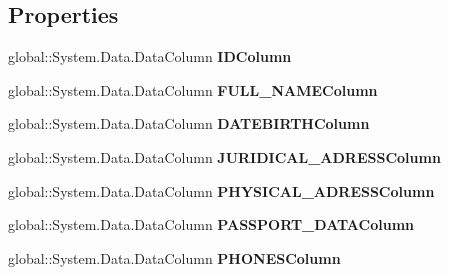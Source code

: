 \subsection*{Properties}
\begin{CompactItemize}
\item 
global::System.Data.DataColumn \textbf{IDColumn}\hspace{0.3cm}{\tt  [get]}\label{class_automatic_medical_system_1_1_data_set1_1_1_v_s_p_e_c_i_a_l_d_o_c_t_o_r_data_table_27838242bc6ac4afa2fd0c4ff007a3ce}

\item 
global::System.Data.DataColumn \textbf{FULL\_\-NAMEColumn}\hspace{0.3cm}{\tt  [get]}\label{class_automatic_medical_system_1_1_data_set1_1_1_v_s_p_e_c_i_a_l_d_o_c_t_o_r_data_table_d22e7071284f6fb3515e7c9ea9e74af4}

\item 
global::System.Data.DataColumn \textbf{DATEBIRTHColumn}\hspace{0.3cm}{\tt  [get]}\label{class_automatic_medical_system_1_1_data_set1_1_1_v_s_p_e_c_i_a_l_d_o_c_t_o_r_data_table_2ccebf746648fd7cfcd5396e8759f9d8}

\item 
global::System.Data.DataColumn \textbf{JURIDICAL\_\-ADRESSColumn}\hspace{0.3cm}{\tt  [get]}\label{class_automatic_medical_system_1_1_data_set1_1_1_v_s_p_e_c_i_a_l_d_o_c_t_o_r_data_table_b385a71c9fc863b6458a40101f01ba3f}

\item 
global::System.Data.DataColumn \textbf{PHYSICAL\_\-ADRESSColumn}\hspace{0.3cm}{\tt  [get]}\label{class_automatic_medical_system_1_1_data_set1_1_1_v_s_p_e_c_i_a_l_d_o_c_t_o_r_data_table_d48891a62d6f1dae2700cebd8590bb49}

\item 
global::System.Data.DataColumn \textbf{PASSPORT\_\-DATAColumn}\hspace{0.3cm}{\tt  [get]}\label{class_automatic_medical_system_1_1_data_set1_1_1_v_s_p_e_c_i_a_l_d_o_c_t_o_r_data_table_f7703cc64ef78bc58df8ef9c12802280}

\item 
global::System.Data.DataColumn \textbf{PHONESColumn}\hspace{0.3cm}{\tt  [get]}\label{class_automatic_medical_system_1_1_data_set1_1_1_v_s_p_e_c_i_a_l_d_o_c_t_o_r_data_table_77b96efdae9abe5d4b8c9793f9e2aee3}


\end{CompactItemize}
